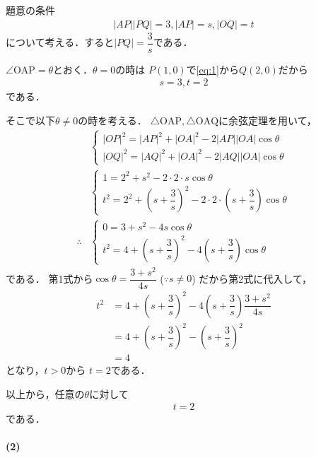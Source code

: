 \documentclass[../../main.tex]{subfiles}
\begin{document}
題意の条件
\begin{align}
  |AP||PQ|=3, |AP|=s, |OQ|=t \label{eq:1}
\end{align}
について考える．すると$|PQ|=\dfrac{3}{s}$である．

$\angle \mathrm{OAP} = \theta$とおく．$\theta = 0$の時は $P(1,0)$で\cref{eq:1}から$Q(2,0)$だから
\begin{align}
  s = 3, t = 2 \label{eq:2}
\end{align}
である．

そこで以下$\theta \neq 0$の時を考える．
$\triangle \mathrm{OAP}, \triangle \mathrm{OAQ}$に余弦定理を用いて，
\begin{align}
  &
  \begin{cases}
    |OP|^2 = |AP|^2+|OA|^2 - 2|AP||OA|\cos\theta \\
    |OQ|^2 = |AQ|^2+|OA|^2 - 2|AQ||OA|\cos\theta
  \end{cases} \\
  &
  \begin{cases}
    1 = 2^2 + s^2 - 2 \cdot 2 \cdot s \cos\theta \\
    t^2 = 2^2 + \left(s + \dfrac{3}{s}\right)^2 - 2 \cdot 2 \cdot \left(s + \dfrac{3}{s}\right) \cos\theta
  \end{cases} \\
  \therefore
  &
  \begin{cases}
    0 = 3 + s^2 - 4s \cos\theta \\
    t^2 = 4 +  \left(s + \dfrac{3}{s}\right)^2 - 4 \left(s + \dfrac{3}{s}\right)\cos\theta
  \end{cases}
\end{align}
である．
第1式から$\cos\theta = \dfrac{3+s^2}{4s}$ ($\because s \neq 0$) だから第2式に代入して，
\begin{align}
  t^2
  &= 4 + \left(s + \dfrac{3}{s}\right)^2 - 4 \left(s + \dfrac{3}{s}\right) \dfrac{3+s^2}{4s} \\
  &= 4 + \left(s + \dfrac{3}{s}\right)^2 - \left(s + \dfrac{3}{s}\right)^2 \\
  &= 4
\end{align}
となり，$t > 0$から $t = 2$である．

以上から，任意の$\theta$に対して
\begin{align}
  t = 2
\end{align}
である．

\paragraph{(2)}
\end{document}
